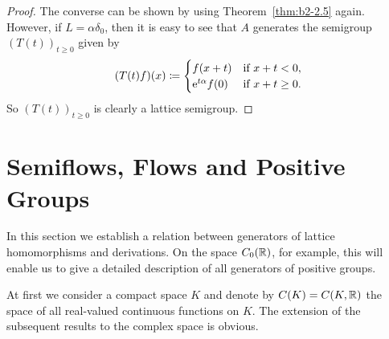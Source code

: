 \begin{proof}
The converse can be shown by using Theorem~\ref{thm:b2-2.5} again.
However, if\/ $L = \alpha\delta_{0}$, then it is easy to see that $A$ generates the semigroup $(T(t))_{t \geq 0}$ given by
\begin{equation*}
(T(t)f)(x) \coloneq \begin{cases}
    f(x+t) & \text{if } x+t < 0  ,\\
    \eu^{t\alpha}f(0) & \text{if } x+t \geq 0  .
\end{cases}
\end{equation*}
So $(T(t))_{t \geq 0}$ is clearly a lattice semigroup.
\end{proof}
\section{Semiflows, Flows and Positive Groups}\label{sec:b2-3}
In this section we establish a relation between generators of lattice homomorphisms and derivations.
On the space $C_{0}(\mathbb{R})$, for example, this will enable us to give a detailed description of all generators of positive groups.

At first we consider a compact space $K$ and denote by $C(K) = C(K,\mathbb{R})$ the space of all real-valued continuous functions on $K$.
The extension of the subsequent results to the complex space is obvious.

